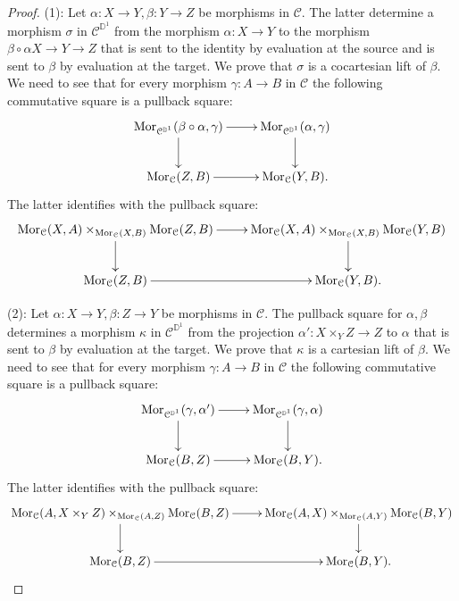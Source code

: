 \documentclass[10pt,oneside]{article}
\numberwithin{equation}{section} %
\numberwithin{figure}{section} %
\theoremstyle{plain}
\theoremstyle{definition}
\newcommand{\bD}{{\mathbb D}}
\newcommand{\mC}{{\mathcal C}}
\newcommand{\Mor}{{\mathrm{Mor}}}
\begin{document}
\begin{proof}

(1): Let $\alpha: X \to Y, \beta: Y \to Z$ be morphisms in $\mC.$
The latter determine a morphism $\sigma$ in $\mC^{\bD^1}$
from the morphism $\alpha: X \to Y$ to the morphism $\beta \circ \alpha X \to Y \to Z$
that is sent to the identity by evaluation at the source and is sent to $\beta$ by evaluation at the target.
We prove that $\sigma$ is a cocartesian lift of $\beta.$
We need to see that for every morphism $\gamma: A \to B$ in $\mC$
the following commutative square is a pullback square:
$$\begin{xy}
\xymatrix{
\Mor_{\mC^{\bD^1}}(\beta \circ \alpha,\gamma) \ar[d]^{} \ar[r]
& \Mor_{\mC^{\bD^1}}(\alpha,\gamma) \ar[d] 
\\ 
\Mor_{\mC}(Z,B) \ar[r] & \Mor_{\mC}(Y,B).}
\end{xy}$$
The latter identifies with the pullback square:
$$\begin{xy}
\xymatrix{
\Mor_{\mC}(X,A) \times_{\Mor_{\mC}(X,B)} \Mor_{\mC}(Z,B) \ar[d]^{} \ar[r]
& \Mor_{\mC}(X,A) \times_{\Mor_{\mC}(X,B)} \Mor_{\mC}(Y,B) \ar[d] 
\\ 
\Mor_{\mC}(Z,B) \ar[r] & \Mor_{\mC}(Y,B).}
\end{xy}$$

(2): Let $\alpha: X \to Y, \beta: Z \to Y $ be morphisms in $\mC.$
The pullback square for $\alpha, \beta$ determines a morphism $\kappa$ in $\mC^{\bD^1}$
from the projection $\alpha': X \times_Y Z \to Z$ to $ \alpha$
that is sent to $\beta$ by evaluation at the target.
We prove that $\kappa$ is a cartesian lift of $\beta.$
We need to see that for every morphism $\gamma: A \to B$ in $\mC$
the following commutative square is a pullback square:
$$\begin{xy}
\xymatrix{
\Mor_{\mC^{\bD^1}}(\gamma, \alpha') \ar[d]^{} \ar[r]
& \Mor_{\mC^{\bD^1}}(\gamma, \alpha) \ar[d] 
\\ 
\Mor_{\mC}(B,Z) \ar[r] & \Mor_{\mC}(B,Y).}
\end{xy}$$
The latter identifies with the pullback square:
$$\begin{xy}
\xymatrix{
\Mor_{\mC}(A,X \times_Y Z) \times_{\Mor_{\mC}(A,Z)} \Mor_{\mC}(B,Z) \ar[d]^{} \ar[r]
& \Mor_{\mC}(A,X) \times_{\Mor_{\mC}(A,Y)} \Mor_{\mC}(B,Y) \ar[d] 
\\ 
\Mor_{\mC}(B,Z) \ar[r] & \Mor_{\mC}(B,Y).}
\end{xy}$$
\end{proof}
\end{document}
